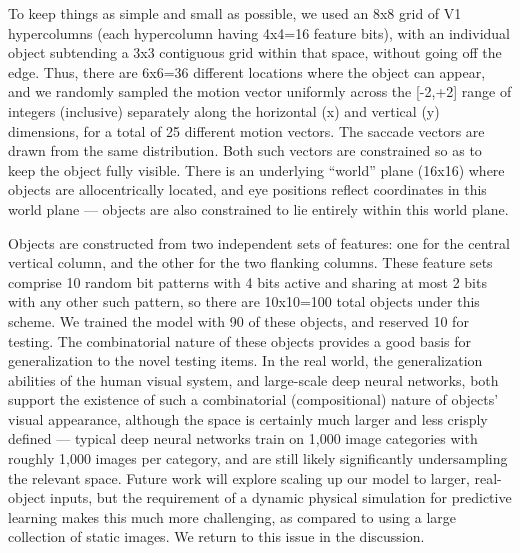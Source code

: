\documentclass[11pt,twoside]{article}
\newif\myifpdf
\begin{document}
To keep things as simple and small as possible, we used an 8x8 grid of V1 hypercolumns (each hypercolumn having 4x4=16 feature bits), with an individual object subtending a 3x3 contiguous grid within that space, without going off the edge.  Thus, there are 6x6=36 different locations where the object can appear, and we randomly sampled the motion vector uniformly across the [-2,+2] range of integers (inclusive) separately along the horizontal (x) and vertical (y) dimensions, for a total of 25 different motion vectors.  The saccade vectors are drawn from the same distribution.  Both such vectors are constrained so as to keep the object fully visible.  There is an underlying ``world'' plane (16x16) where objects are allocentrically located, and eye positions reflect coordinates in this world plane --- objects are also constrained to lie entirely within this world plane.

Objects are constructed from two independent sets of features: one for the central vertical column, and the other for the two flanking columns.  These feature sets comprise 10 random bit patterns with 4 bits active and sharing at most 2 bits with any other such pattern, so there are 10x10=100 total objects under this scheme.  We trained the model with 90 of these objects, and reserved 10 for testing.  The combinatorial nature of these objects provides a good basis for generalization to the novel testing items.  In the real world, the generalization abilities of the human visual system, and large-scale deep neural networks, both support the existence of such a combinatorial (compositional) nature of objects' visual appearance, although the space is certainly much larger and less crisply defined --- typical deep neural networks train on 1,000 image categories with roughly 1,000 images per category, and are still likely significantly undersampling the relevant space.  Future work will explore scaling up our model to larger, real-object inputs, but the requirement of a dynamic physical simulation for predictive learning makes this much more challenging, as compared to using a large collection of static images.  We return to this issue in the discussion.
\end{document}
